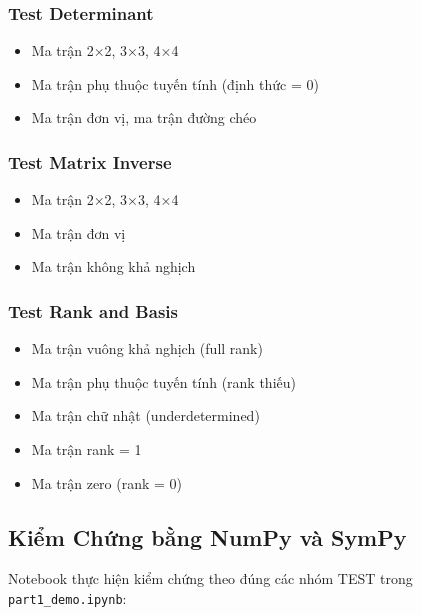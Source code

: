 \documentclass[12pt, a4paper, twoside]{article}
\begin{document}
\subsubsection{Test Determinant}

\begin{itemize}
    \item Ma trận 2×2, 3×3, 4×4
    \item Ma trận phụ thuộc tuyến tính (định thức = 0)
    \item Ma trận đơn vị, ma trận đường chéo
\end{itemize}

\subsubsection{Test Matrix Inverse}

\begin{itemize}
    \item Ma trận 2×2, 3×3, 4×4
    \item Ma trận đơn vị
    \item Ma trận không khả nghịch
\end{itemize}

\subsubsection{Test Rank and Basis}

\begin{itemize}
    \item Ma trận vuông khả nghịch (full rank)
    \item Ma trận phụ thuộc tuyến tính (rank thiếu)
    \item Ma trận chữ nhật (underdetermined)
    \item Ma trận rank = 1
    \item Ma trận zero (rank = 0)
\end{itemize}

\subsection{Kiểm Chứng bằng NumPy và SymPy}

Notebook thực hiện kiểm chứng theo đúng các nhóm TEST trong \texttt{part1\_demo.ipynb}:
\end{document}
